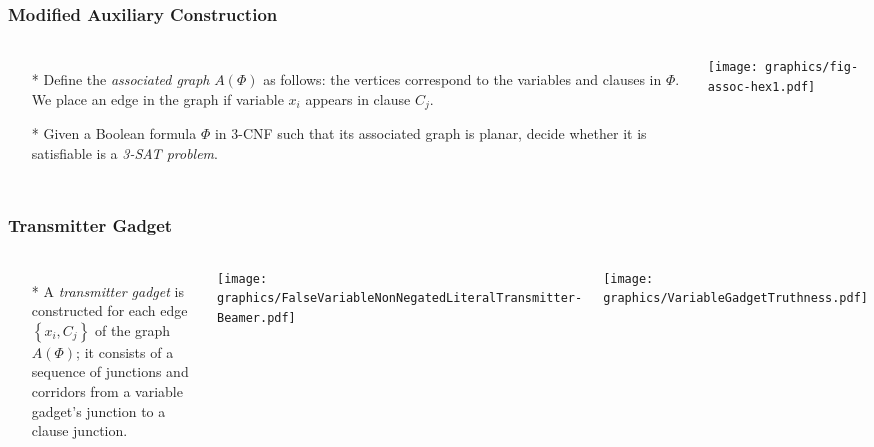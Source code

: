 \documentclass{beamer}
\begin{document}
\begin{frame} \frametitle{Modified Auxiliary Construction}
    \begin{columns}[c]
        \begin{itemize}
            \item[*] Define the \textit{associated graph} $A(\Phi)$ as follows: the vertices correspond to the variables and clauses in $\Phi$.   
We place an edge in the graph if variable $x_i$ appears in clause $C_j$.
            \item[*] Given a Boolean formula $\Phi$ in 3-CNF such that its associated graph is planar, decide whether it 
is satisfiable is a \textit{3-SAT problem}.
        \end{itemize}
        \begin{minipage}{\linewidth}
            \begin{center}
            \texttt{[image: graphics/fig-assoc-hex1.pdf]}
            \end{center}
        \end{minipage}
    \end{columns}
\end{frame}

\begin{frame} \frametitle{Transmitter Gadget}
    \begin{columns}[c]
        \begin{itemize}
            \item[*] A {\it transmitter gadget} is constructed for each edge $\left\lbrace x_i,C_j\right\rbrace$ of the graph $A(\Phi)$; it consists of a sequence of junctions and corridors from a variable gadget's junction to a clause junction.  
        \end{itemize}
        \begin{minipage}{\linewidth}
            \begin{center}
            \texttt{[image: graphics/FalseVariableNonNegatedLiteralTransmitter-Beamer.pdf]}
            \end{center}
        \end{minipage}

        \begin{minipage}{\linewidth}
            \begin{center}
            \texttt{[image: graphics/VariableGadgetTruthness.pdf]}
        \end{center}
        \end{minipage}
    \end{columns}
\end{frame}
\end{document}
